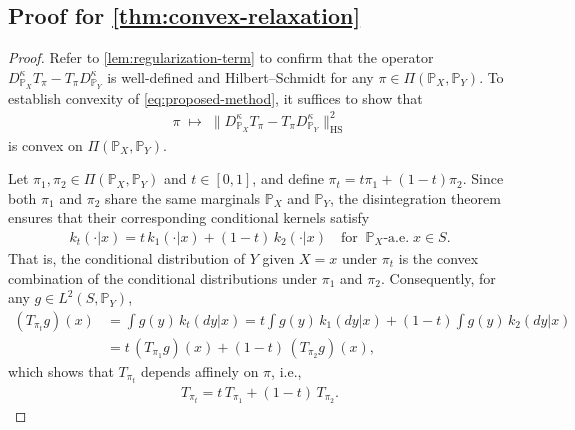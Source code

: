 \documentclass{article}
\begin{document}
\subsection{Proof for \cref{thm:convex-relaxation}}\label{pf:thm:convex-relaxation}
\begin{proof}
	Refer to \cref{lem:regularization-term} to confirm that the operator $D_{\mathbb{P}_X}^{\kappa}T_{\pi} - T_{\pi}D_{\mathbb{P}_Y}^{\kappa}$ is well-defined and Hilbert--Schmidt for any $\pi \in \Pi(\mathbb{P}_X,\mathbb{P}_Y)$. 
	To establish convexity of \eqref{eq:proposed-method}, it suffices to show that 
	\begin{align*}
	\pi \;\mapsto\; \|D_{\mathbb{P}_X}^{\kappa}T_\pi - T_\pi D_{\mathbb{P}_Y}^{\kappa}\|_{\mathrm{HS}}^2
	\end{align*}
	is convex on $\Pi(\mathbb{P}_X,\mathbb{P}_Y)$.
	
	Let $\pi_1,\pi_2 \in \Pi(\mathbb{P}_X,\mathbb{P}_Y)$ and $t \in [0,1]$, and define $\pi_t = t\pi_1 + (1-t)\pi_2$. 
	Since both $\pi_1$ and $\pi_2$ share the same marginals $\mathbb{P}_X$ and $\mathbb{P}_Y$, 
	the disintegration theorem ensures that their corresponding conditional kernels satisfy
	\begin{align*}
	k_t(\cdot|x) = t\,k_1(\cdot|x) + (1-t)\,k_2(\cdot|x)
	\quad \text{for} \;\; \mathbb{P}_X\text{-a.e.} \; x \in S.
	\end{align*}
	That is, the conditional distribution of $Y$ given $X=x$ under $\pi_t$ is the convex combination of the conditional distributions under $\pi_1$ and $\pi_2$. 
	Consequently, for any $g \in L^2(S,\mathbb{P}_Y)$,
	\begin{align*}
		(T_{\pi_t} g)(x)
		&= \int g(y)\,k_t(dy|x)
		= t \int g(y)\,k_1(dy|x) + (1-t)\int g(y)\,k_2(dy|x) \\
		&= t\,(T_{\pi_1}g)(x) + (1-t)\,(T_{\pi_2}g)(x),
	\end{align*}
	which shows that $T_{\pi_t}$ depends affinely on $\pi$, i.e.,
	\begin{align*}
	T_{\pi_t} = t\,T_{\pi_1} + (1-t)\,T_{\pi_2}.
	\end{align*}
	

\end{proof}
\end{document}
